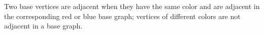 \begin{definition}
Two base vertices are adjacent when they have the same color and are adjacent
in the corresponding red or blue base graph; vertices of different colors are
not adjacent in a base graph.
\end{definition}
